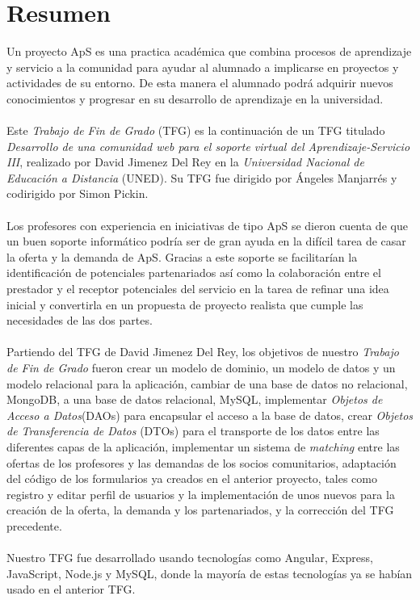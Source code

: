 \documentclass[11pt]{book}
\begin{document}
	\chapter*{Resumen} 
	Un proyecto ApS es una practica académica que combina procesos de aprendizaje y servicio a la comunidad para ayudar al alumnado a implicarse en proyectos y actividades de su entorno. De esta manera el alumnado podrá adquirir nuevos conocimientos y progresar en su desarrollo de aprendizaje en la universidad.\\\\
	Este \textit{Trabajo de Fin de Grado} (TFG) es la continuación de un TFG titulado \textit{Desarrollo de una comunidad web para el soporte virtual del Aprendizaje-Servicio III}, realizado por David Jimenez Del Rey en la \emph{Universidad Nacional de Educación a Distancia} (UNED). Su TFG fue dirigido por Ángeles Manjarrés y codirigido por Simon Pickin. \\\\
	Los profesores con experiencia en iniciativas de tipo ApS se dieron cuenta de que un buen soporte informático podría ser de gran ayuda en la difícil tarea de casar la oferta y la demanda de ApS. Gracias a este soporte se facilitarían la identificación de potenciales partenariados así como la colaboración entre el prestador y el receptor potenciales del servicio en la tarea de refinar una idea inicial y convertirla en un propuesta de proyecto realista que cumple las necesidades de las dos partes.\\\\ 
	Partiendo del TFG de David Jimenez Del Rey, los objetivos de nuestro \textit{Trabajo de Fin de Grado} fueron crear un modelo de dominio, un modelo de datos y un modelo relacional para la aplicación, cambiar de una base de datos no relacional, MongoDB, a una base de datos relacional, MySQL, implementar \emph{Objetos de Acceso a Datos}(DAOs) para encapsular el acceso a la base de datos, crear \emph{Objetos de Transferencia de Datos} (DTOs) para el transporte de los datos entre las diferentes capas de la aplicación, implementar un sistema de \textit{matching} entre las ofertas de los profesores y las demandas de los socios comunitarios, adaptación del código de los formularios ya creados en el anterior proyecto, tales como registro  y editar perfil de usuarios y la implementación de unos nuevos para la creación  de la oferta, la demanda y los partenariados, y la corrección del TFG precedente.\\\\
	Nuestro TFG fue desarrollado usando tecnologías como Angular, Express, JavaScript, Node.js y MySQL, donde la mayoría de estas tecnologías ya se habían usado en el anterior TFG.\\\\
	
\end{document}
